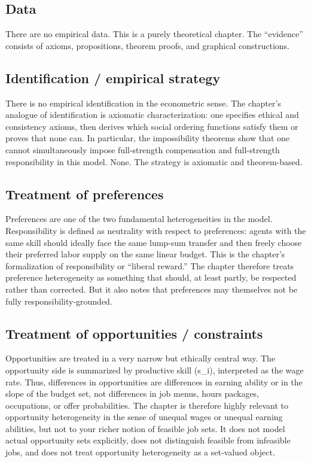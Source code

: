 \documentclass[11pt,a4paper]{article}
\begin{document}
\subsection*{Data}
There are no empirical data. This is a purely theoretical chapter. The “evidence” consists of axioms, propositions, theorem proofs, and graphical constructions.

\subsection*{Identification / empirical strategy}
There is no empirical identification in the econometric sense. The chapter’s analogue of identification is axiomatic characterization: one specifies ethical and consistency axioms, then derives which social ordering functions satisfy them or proves that none can. In particular, the impossibility theorems show that one cannot simultaneously impose full-strength compensation and full-strength responsibility in this model. None. The strategy is axiomatic and theorem-based.

\subsection*{Treatment of preferences}
Preferences are one of the two fundamental heterogeneities in the model. Responsibility is defined as neutrality with respect to preferences: agents with the same skill should ideally face the same lump-sum transfer and then freely choose their preferred labor supply on the same linear budget. This is the chapter’s formalization of responsibility or “liberal reward.” The chapter therefore treats preference heterogeneity as something that should, at least partly, be respected rather than corrected. But it also notes that preferences may themselves not be fully responsibility-grounded.

\subsection*{Treatment of opportunities / constraints}
Opportunities are treated in a very narrow but ethically central way. The opportunity side is summarized by productive skill (s\_i), interpreted as the wage rate. Thus, differences in opportunities are differences in earning ability or in the slope of the budget set, not differences in job menus, hours packages, occupations, or offer probabilities. The chapter is therefore highly relevant to opportunity heterogeneity in the sense of unequal wages or unequal earning abilities, but not to your richer notion of feasible job sets. It does not model actual opportunity sets explicitly, does not distinguish feasible from infeasible jobs, and does not treat opportunity heterogeneity as a set-valued object.
\end{document}
